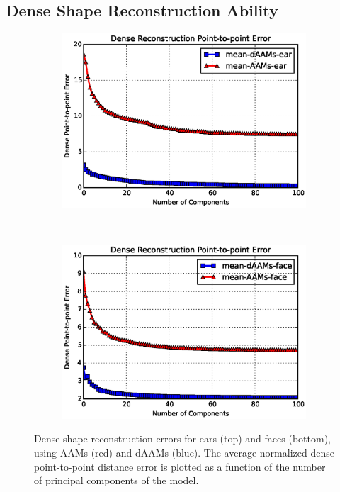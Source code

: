 \subsection{Dense Shape Reconstruction Ability}

\begin{figure}[!t]
    \centering
    \begin{subfigure}[b]{\columnwidth}
            \includegraphics[width=\textwidth,trim={0 0 0 25pt},clip]{resources/Suplementory_Meterial/Model_Analysis/sr_ear}
    \end{subfigure}
    \\
    \begin{subfigure}[b]{\columnwidth}
            \includegraphics[width=\textwidth,trim={0 0 0 25pt},clip]{resources/Suplementory_Meterial/Model_Analysis/sr_face}
    \end{subfigure}
    \caption{Dense shape reconstruction errors for ears (top) and faces (bottom), using AAMs (red) and dAAMs (blue). The average normalized dense point-to-point distance error is plotted as a function of the number of principal components of the model.}
    \label{fig:rc_face}
\end{figure}

